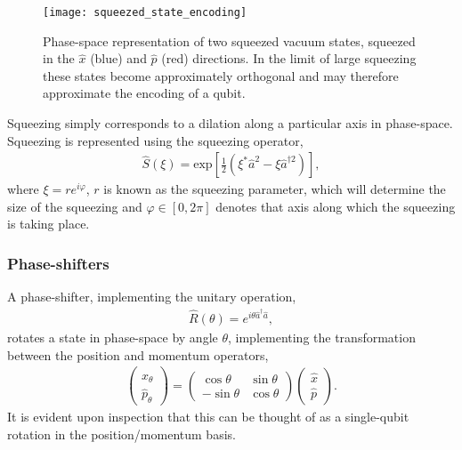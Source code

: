 \begin{figure}[!htb]
\texttt{[image: squeezed\_state\_encoding]}
\caption{Phase-space representation of two squeezed vacuum states, squeezed in the $\hat{x}$ (blue) and $\hat{p}$ (red) directions. In the limit of large squeezing these states become approximately orthogonal and may therefore approximate the encoding of a qubit.} \label{fig:squeezed_state_encoding}	
\end{figure}

Squeezing simply corresponds to a dilation along a particular axis in phase-space. Squeezing is represented using the squeezing operator,
\begin{align}\label{eq:sq_op}
\hat{S}(\xi) = \text{exp}\left[ \frac{1}{2}(\xi^*\hat{a}^2 - \xi{\hat{a}^{\dag 2}})\right],
\end{align}
where \mbox{$\xi  = r e^{i \varphi}$}, $r$ is known as the squeezing parameter, which will determine the size of the squeezing and \mbox{$\varphi \in [0, 2\pi]$} denotes that axis along which the squeezing is taking place.


%
%

\subsubsection{Phase-shifters}

A phase-shifter, implementing the unitary operation,
\begin{align}
\hat{R}(\theta) = e^{i\theta \hat a^\dag \hat a},
\end{align}
rotates a state in phase-space by angle $\theta$, implementing the transformation between the position and momentum operators,
\begin{align}
\begin{pmatrix}
\hat x_{\theta}\\
\hat p_{\theta}
\end{pmatrix}
=
\begin{pmatrix}\cos\theta & \sin\theta \\
-\sin\theta & \cos\theta
\end{pmatrix}
\begin{pmatrix}
\hat x\\
\hat p
\end{pmatrix}.
\end{align}
It is evident upon inspection that this can be thought of as a single-qubit rotation in the position/momentum basis. 

